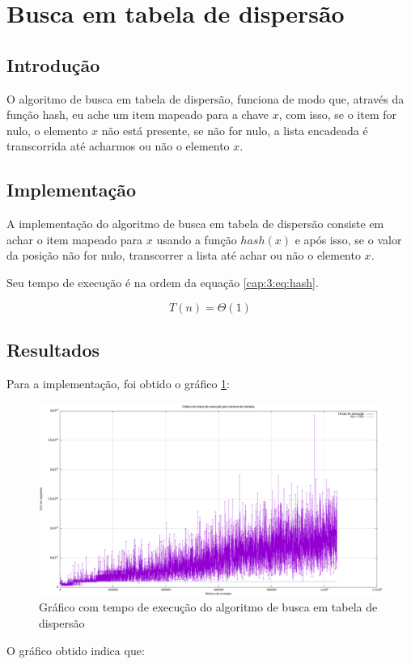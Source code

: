 \section{Busca em tabela de dispersão} \label{cap:3:section:hash}

\subsection{Introdução}

O algoritmo de busca em tabela de dispersão, funciona de modo que, através da função
hash, eu ache um item mapeado para a chave $x$, com isso, se o item for nulo, o elemento
$x$ não está presente, se não for nulo, a lista encadeada é transcorrida até acharmos ou não
o elemento $x$.

\subsection{Implementação}

A implementação do algoritmo de busca em tabela de dispersão consiste em achar o item mapeado para
$x$ usando a função $hash(x)$ e após isso, se o valor da posição não for nulo, transcorrer a lista
até achar ou não o elemento $x$.



Seu tempo de execução é na ordem da equação \ref{cap:3:eq:hash}.

\begin{equation} \label{cap:3:eq:bTree}
    T(n) = \Theta(1)
\end{equation}

\subsection{Resultados}

Para a implementação, foi obtido o gráfico \ref{cap:3:graph:hash}:

\begin{figure}[h]
    \centering
    \includegraphics[width=\textwidth]{image/graphics/hash.png}
    \caption{Gráfico com tempo de execução do algoritmo de busca em tabela de dispersão}
    \label{cap:3:graph:hash}
\end{figure}

O gráfico obtido indica que:
